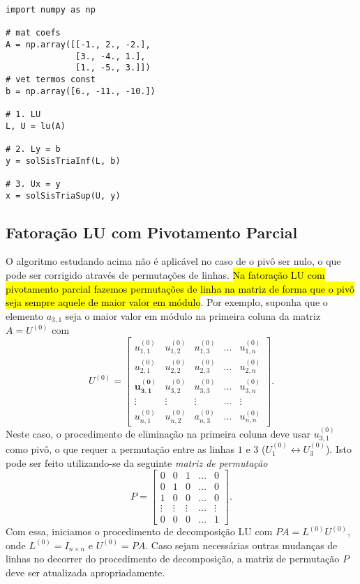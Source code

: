 \begin{ex}
\begin{lstlisting}
import numpy as np

# mat coefs
A = np.array([[-1., 2., -2.],
              [3., -4., 1.],
              [1., -5., 3.]])
# vet termos const
b = np.array([6., -11., -10.])

# 1. LU
L, U = lu(A)

# 2. Ly = b
y = solSisTriaInf(L, b)

# 3. Ux = y
x = solSisTriaSup(U, y)
\end{lstlisting}

\end{ex}

\subsection{Fatoração LU com Pivotamento Parcial}

O algoritmo estudando acima não é aplicável no caso de o pivô ser nulo, o que pode ser corrigido através de permutações de linhas. \hl{Na fatoração LU com pivotamento parcial fazemos permutações de linha na matriz de forma que o pivô seja sempre aquele de maior valor em módulo}. Por exemplo, suponha que o elemento $a_{3,1}$ seja o maior valor em módulo na primeira coluna da matriz $A = U^{(0)}$ com
\begin{equation}
  U^{(0)} = \begin{bmatrix}
    u_{1,1}^{(0)} & u_{1,2}^{(0)} & u_{1,3}^{(0)} & \ldots & u_{1,n}^{(0)} \\
    u_{2,1}^{(0)} & u_{2,2}^{(0)} & u_{2,3}^{(0)} & \ldots & u_{2,n}^{(0)} \\
    \pmb{u_{3,1}^{(0)}} & u_{3,2}^{(0)} & u_{3,3}^{(0)} & \ldots & u_{3,n}^{(0)} \\
    \vdots & \vdots & \vdots & \ldots & \vdots \\
    u_{n,1}^{(0)} & u_{n,2}^{(0)} & a_{n,3}^{(0)} & \ldots & u_{n,n}^{(0)}
  \end{bmatrix}.
\end{equation}
Neste caso, o procedimento de eliminação na primeira coluna deve usar $u_{3,1}^{(0)}$ como pivô, o que requer a permutação entre as linhas $1$ e $3$ ($U_1^{(0)} \leftrightarrow U_3^{(0)}$). Isto pode ser feito utilizando-se da seguinte \emph{matriz de permutação}
\begin{equation}
  P =
  \begin{bmatrix}
    0 & 0 & 1 & \ldots & 0\\
    0 & 1 & 0 & \ldots & 0\\
    1 & 0 & 0 & \ldots & 0\\
    \vdots & \vdots & \vdots & \ldots & \vdots\\
    0 & 0 & 0 & \ldots & 1
  \end{bmatrix}.
\end{equation}
Com essa, iniciamos o procedimento de decomposição LU com $PA = L^{(0)}U^{(0)}$, onde $L^{(0)} = I_{n\times n}$ e $U^{(0)} = PA$. Caso sejam necessárias outras mudanças de linhas no decorrer do procedimento de decomposição, a matriz de permutação $P$ deve ser atualizada apropriadamente.

